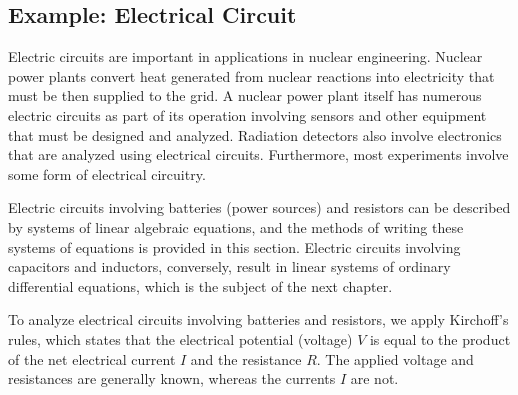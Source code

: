 \subsection{Example: Electrical Circuit}

Electric circuits are important in applications in nuclear engineering. Nuclear power plants convert heat generated from nuclear reactions into electricity that must be then supplied to the grid. A nuclear power plant itself has numerous electric circuits as part of its operation involving sensors and other equipment that must be designed and analyzed. Radiation detectors also involve electronics that are analyzed using electrical circuits. Furthermore, most experiments involve some form of electrical circuitry.

Electric circuits involving batteries (power sources) and resistors can be described by systems of linear algebraic equations, and the methods of writing these systems of equations is provided in this section. Electric circuits involving capacitors and inductors, conversely, result in linear systems of ordinary differential equations, which is the subject of the next chapter.

To analyze electrical circuits involving batteries and resistors, we apply Kirchoff's rules, which states that the electrical potential (voltage) $V$ is equal to the product of the net electrical current $I$ and the resistance $R$. The applied voltage and resistances are generally known, whereas the currents $I$ are not.

